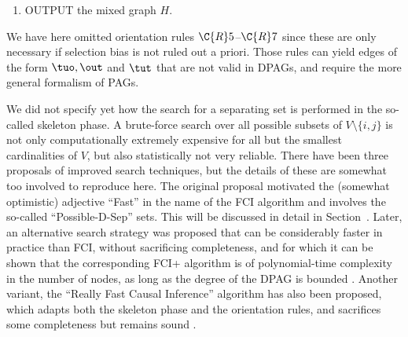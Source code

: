 \begin{enumerate}
    \begin{description}
      \item[$\C{R}8$] If $i \tuh j \tuh k$ in $H$, and $i \ouh k$ in $H$, then orient $i \tuh k$.
      \item[$\C{R}9$] If $i \ouh k$, and $\pi = \lt i, j, \dots, k \rt$ is an uncovered possibly directed path in $H$ from $i$ to $k$ such that $j$ and $k$ are not adjacent in $H$, then orient $i \tuh k$.
      \item[$\C{R}10$] Suppose that $i \ouh k$ in $H$, $j \tuh k \hut l$ in $H$, $\pi_1$ is a uncovered possibly directed path in $H$ from $i$ to $j$, and $\pi_2$ is a uncovered possibly directed path in $H$ from $i$ to $l$. Let $u_1$ be the vertex adjacent to $i$ on $\pi_1$ (possibly $u_1 = j$) and $u_2$ the vertex adjacent to $i$ on $\pi_2$ (possibly $u_2 = l$). If $u_1 \ne u_2$, and $u_1$ and $u_2$ are not adjacent in $H$, then orient $i \tuh k$.
    \end{description}
  \item OUTPUT the mixed graph $H$.
\end{enumerate}
We have here omitted orientation rules $\C{R}5$--$\C{R}7$ since these are only necessary if selection bias is not ruled out a
priori. 
Those rules can yield edges of the form $\tuo, \out$ and $\tut$ that are not valid in DPAGs, and require the more general
formalism of PAGs.

We did not specify yet how the search for a separating set is performed in the so-called skeleton phase.
A brute-force search over all possible subsets of $V\setminus \{i,j\}$ is not only computationally extremely expensive for all but the smallest cardinalities of $V$, but also statistically not very reliable.
There have been three proposals of improved search techniques, but the details of these are somewhat too involved to reproduce here.
The original proposal motivated the (somewhat optimistic) adjective ``Fast'' in the name of the FCI algorithm and involves the so-called ``Possible-D-Sep'' sets. This will be discussed in detail in Section~\label{ref:fci_skeleton}.
Later, an alternative search strategy was proposed that can be considerably faster in practice than FCI, without sacrificing completeness, and for which it can be shown that the corresponding FCI+ algorithm is of polynomial-time complexity in the number of nodes, as long as the degree of the DPAG is bounded \cite{ClaassenMooijHeskes_UAI_13}.
Another variant, the ``Really Fast Causal Inference'' algorithm has also been proposed, which adapts both the skeleton phase and the orientation rules, and sacrifices some completeness but remains sound \cite{Colombo++2012}.

